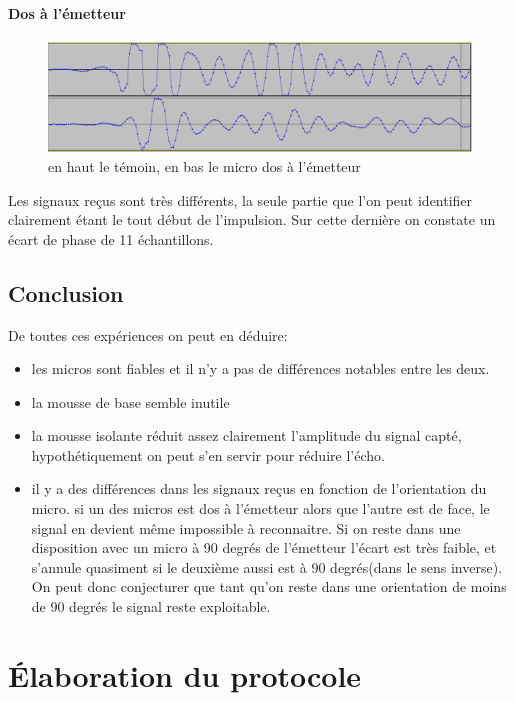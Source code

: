 \subsubsection{Dos à l'émetteur}
\begin{figure}[H]
\includegraphics[width=\textwidth]{resources/img/dos_a_la_source.png}
\caption{en haut le témoin, en bas le micro dos à l'émetteur}
\end{figure}
Les signaux reçus sont très différents, la seule partie que l'on peut identifier clairement étant le tout début de l'impulsion. Sur cette dernière on constate un écart de phase de 11 échantillons.

\section{Conclusion}
De toutes ces expériences on peut en déduire:
\begin{itemize}
\item les micros sont fiables et il n'y a pas de différences notables entre les deux.
\item la mousse de base semble inutile
\item la mousse isolante réduit assez clairement l'amplitude du signal capté, hypothétiquement on peut s'en servir pour réduire l'écho.
\item il y a des différences dans les signaux reçus en fonction de l'orientation du micro. si un des micros est dos à l'émetteur alors que l'autre est de face, le signal en devient même impossible à reconnaitre. Si on reste dans une disposition avec un micro à 90 degrés de l'émetteur l'écart est très faible, et s'annule quasiment si le deuxième aussi est à 90 degrés(dans le sens inverse). On peut donc conjecturer que tant qu'on reste dans une orientation de moins de 90 degrés le signal reste exploitable.
\end{itemize}





\chapter{Élaboration du protocole}

